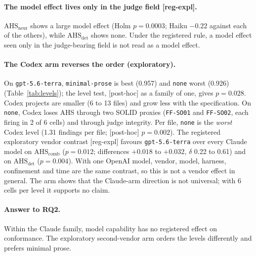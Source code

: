 \documentclass[10pt,a4paper]{article}
\newcommand{\regX}{\textsf{\scriptsize[reg-expl]}}  %
\newcommand{\ph}{\textsf{\scriptsize[post-hoc]}}    %
\newcommand{\ff}[1]{\texttt{\small #1}}
\newcommand{\lev}[1]{\texttt{\small #1}}
\newcommand{\AHSc}{\mathrm{AHS}_{\mathrm{comb}}}
\newcommand{\AHSd}{\mathrm{AHS}_{\mathrm{det}}}
\newcommand{\AHSn}{\mathrm{AHS}_{\mathrm{neur}}}
\begin{document}
\paragraph{The model effect lives only in the judge field \regX{}.} $\AHSn$ shows a large model effect (Holm
$p = 0.0003$; Haiku $-0.22$ against each of the others), while $\AHSd$ shows none. Under the registered rule, a model
effect seen only in the judge-bearing field is not read as a model effect. %

\paragraph{The Codex arm reverses the order (exploratory).} On \texttt{gpt-5.6-terra}, \lev{minimal-prose} is best
(0.957) and \lev{none} worst (0.926) (Table~\ref{tab:levels}); the level test, \ph{} as a family of one, gives
$p = 0.028$. %
Codex projects are smaller (6 to 13 files) and grow less with the specification. On \lev{none}, Codex loses AHS
through two SOLID proxies (\ff{FF-SO01} and \ff{FF-SO02}, each firing in 2 of 6 cells) and through judge integrity.
Per file, \lev{none} is the \emph{worst} Codex level (1.31 findings per file; \ph{} $p = 0.002$).
The registered exploratory vendor contrast \regX{} favours \texttt{gpt-5.6-terra} over every Claude model on $\AHSc$
($p = 0.012$; differences $+0.018$ to $+0.032$, $\delta$ 0.22 to 0.61) and on $\AHSd$ ($p = 0.004$).
With one OpenAI model, vendor, model, harness, confinement and time are the same contrast, so this is not a vendor
effect in general. %
The arm shows that the Claude-arm direction is not universal; with 6 cells per level it supports no claim.

\paragraph{Answer to RQ2.} Within the Claude family, model capability has no registered effect on conformance. The
exploratory second-vendor arm orders the levels differently and prefers minimal prose.
\end{document}
